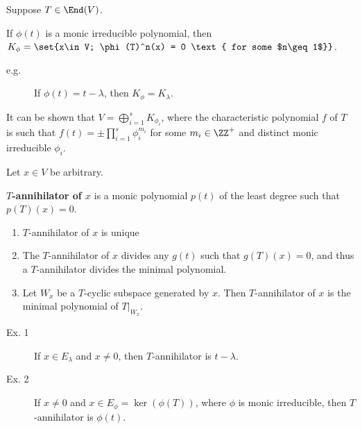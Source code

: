 \documentclass[11pt]{scrartcl}
\begin{document}
\begin{definition}
\hfill

Suppose $T \in \End(V)$.

  If $\phi(t)$ is a monic irreducible polynomial, then $K_{\phi} = \set{x\in V; \phi(T)^n(x) = 0 \text{ for some $n\geq 1$}}$.
\end{definition}
\begin{description}

\item[e.g.] If $\phi(t) = t-\lambda$, then $K_{\phi} = K_{\lambda}$.

\end{description}

It can be shown that $V = \bigoplus_{i=1}^s K_{\phi_{i}}$, where the
characteristic polynomial $f$ of $T$ is such that
$f(t) =\pm \prod_{i=1}^s\phi^{m_i}_{i}$ for some $m_i\in \ZZ^+$ and
distinct monic irreducible $\phi_i$.

\begin{definition}
\hfill

Let $x\in V$ be arbitrary.

\textbf{$T$-annihilator of $x$} is a monic polynomial $p(t)$ of the
least degree such that $p(T)(x)=0$.
\end{definition}

\begin{theorem}
\hfill

  \begin{enumerate}[label=\alph*)]
  \item $T$-annihilator of $x$ is unique
  \item The $T$-annihilator of $x$ divides any $g(t)$ such that $g(T)(x) = 0$, and thus a $T$-annihilator divides the minimal polynomial.
  \item Let $W_x$ be a $T$-cyclic subspace generated by $x$. Then
    $T$-annihilator of $x$ is the minimal polynomial of $T|_{W_x}$.
  \end{enumerate}
\end{theorem}
\begin{description}

\item[Ex. 1] If $x\in E_{\lambda}$ and $x\neq 0$, then $T$-annihilator is $t-\lambda$.
\item[Ex. 2] If $x\neq 0$ and $x\in E_{\phi} = \ker(\phi(T))$, where $\phi$ is monic irreducible, then $T$-annihilator is $\phi(t)$.

\end{description}
\end{document}
